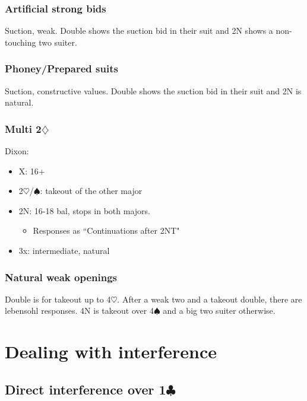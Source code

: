 \documentclass[a4paper,12pt]{article}
\begin{document}
\subsubsection{Artificial strong bids}

Suction, weak. Double shows the suction bid in their suit and 2N shows a
non-touching two suiter.

\subsubsection{Phoney/Prepared suits}

Suction, constructive values. Double shows the suction bid in their suit and 2N
is natural.

\subsubsection{Multi 2$\diamondsuit$}

Dixon:

\begin{itemize}
\item X: 16+
\item 2$\heartsuit$/$\spadesuit$: takeout of the other major
\item 2N: 16-18 bal, stops in both majors.
	\begin{itemize}
	\item Responses as ``Continuations after 2NT"
	\end{itemize}
\item 3x: intermediate, natural
\end{itemize}

\subsubsection{Natural weak openings}

Double is for takeout up to 4$\heartsuit$. After a weak two and a takeout double, there
are lebensohl responses. 4N is takeout over 4$\spadesuit$ and a big two suiter otherwise.

\section{Dealing with interference}

\subsection{Direct interference over 1$\clubsuit$}
\end{document}

